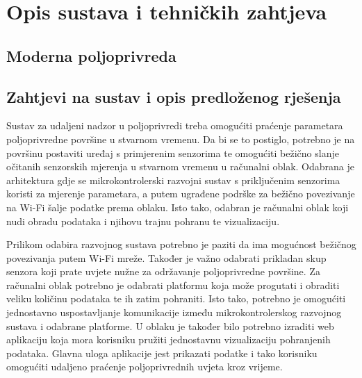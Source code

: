 \chapter{Opis sustava i tehničkih zahtjeva}

\section{Moderna poljoprivreda}


\section{Zahtjevi na sustav i opis predloženog rješenja}

Sustav za udaljeni nadzor u poljoprivredi treba omogućiti praćenje parametara poljoprivredne površine u stvarnom vremenu. Da bi se to postiglo, potrebno je na površinu postaviti uređaj s primjerenim senzorima te omogućiti bežično slanje očitanih senzorskih mjerenja u stvarnom vremenu u računalni oblak. Odabrana je arhitektura gdje se mikrokontrolerski razvojni sustav s priključenim senzorima koristi za mjerenje parametara, a putem ugrađene podrške za bežično povezivanje na Wi-Fi šalje podatke prema oblaku. Isto tako, odabran je računalni oblak koji nudi obradu podataka i njihovu trajnu pohranu te vizualizaciju. 

Prilikom odabira razvojnog sustava potrebno je paziti da ima mogućnost bežičnog povezivanja putem Wi-Fi mreže. Također je važno odabrati prikladan skup senzora koji prate uvjete nužne za održavanje poljoprivredne površine. Za računalni oblak potrebno je odabrati platformu koja može progutati i obraditi veliku količinu podataka te ih zatim pohraniti. Isto tako, potrebno je omogućiti jednostavno uspostavljanje komunikacije između mikrokontrolerskog razvojnog sustava i odabrane platforme. U oblaku je također bilo potrebno izraditi web aplikaciju koja mora korisniku pružiti jednostavnu vizualizaciju pohranjenih podataka. Glavna uloga aplikacije jest prikazati podatke i tako korisniku omogućiti udaljeno praćenje poljoprivrednih uvjeta kroz vrijeme. 

